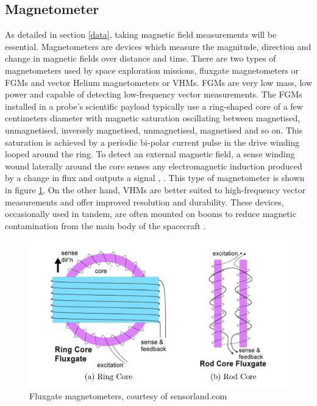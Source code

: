 \documentclass[12pt]{article}
\begin{document}
\subsection{Magnetometer}
\vspace{\baselineskip}

As detailed in section \ref{data}, taking magnetic field measurements will be essential. Magnetometers are devices which measure the magnitude, direction and change in magnetic fields over distance and time. There are two types of magnetometers used by space exploration missions, fluxgate magnetometers or FGMs and vector Helium magnetometers or VHMs. FGMs are very low mass, low power and capable of detecting low-frequency vector measurements. The FGMs installed in a probe’s scientific payload typically use a ring-shaped core of a few centimeters diameter with magnetic saturation oscillating between magnetised, unmagnetised, inversely magnetised, unmagnetised, magnetised and so on. This saturation is achieved by a periodic bi-polar current pulse in the drive winding looped around the ring. To detect an external magnetic field, a sense winding wound laterally around the core senses any electromagnetic induction produced by a change in flux and outputs a signal \cite{fluxgate}, \cite{whatisfluxgate}. This type of magnetometer is shown in figure \ref{magnetometer_diagram}. On the other hand, VHMs are better suited to high-frequency vector measurements and offer improved resolution and durability. These devices, occasionally used in tandem, are often mounted on booms to reduce magnetic contamination from the main body of the spacecraft \cite{magnetometers}.

\begin{figure}[H]
    \centering
    \includegraphics[width = 12cm]{Media/Document/magnetometer.PNG}
    \caption{Fluxgate magnetometers, courtesy of sensorland.com}
    \label{magnetometer_diagram}
\end{figure}
\end{document}
